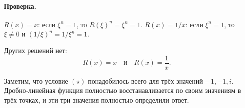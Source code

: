 \documentclass[12pt,a4paper]{article}
\begin{document}
\paragraph{Проверка.}
$R(x)=x$: если $\xi^{n}=1$, то $R(\xi)^{n}=\xi^{n}=1$.
$R(x)=1/x$: если $\xi^{n}=1$, то $\xi\ne0$ и
$(1/\xi)^{n}=1/\xi^{n}=1$.

Других решений нет:
\[
  \boxed{\;R(x)=x\quad\text{и}\quad R(x)=\frac1x.\;}
\]

Заметим, что условие $(\star)$ понадобилось всего для трёх значений
-- $1,-1,i$. Дробно-линейная функция полностью восстанавливается по
своим значениям в трёх точках, и эти три значения полностью определили
ответ.
\end{document}
